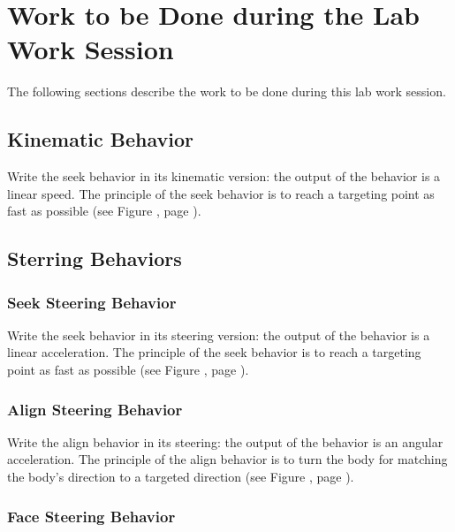 \documentclass[article,english,nodocumentinfo]{multiagentfrreport}
\begin{document}
\section{Work to be Done during the Lab Work Session}

The following sections describe the work to be done during this lab work session.

\subsection{Kinematic Behavior}

Write the seek behavior in its kinematic version: the output of the behavior is a linear speed.
The principle of the seek behavior is to reach a targeting point as fast as possible (see Figure , page ).


\subsection{Sterring Behaviors}

\subsubsection{Seek Steering Behavior}

Write the seek behavior in its steering version: the output of the behavior is a linear acceleration.
The principle of the seek behavior is to reach a targeting point as fast as possible (see Figure , page ).

\subsubsection{Align Steering Behavior}

Write the align behavior in its steering: the output of the behavior is an angular acceleration.
The principle of the align behavior is to turn the body for matching the body's direction to a targeted direction (see Figure , page ).


\subsubsection{Face Steering Behavior}
\end{document}
